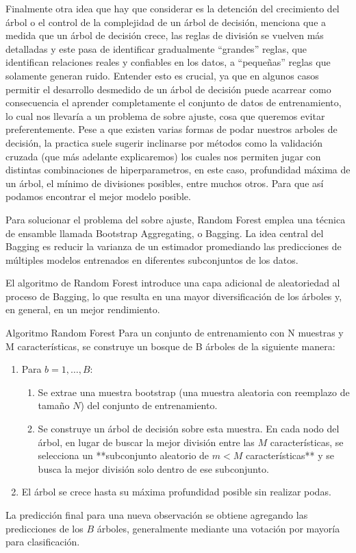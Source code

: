 Finalmente otra idea que hay que considerar es la detención del crecimiento del árbol o el control de la complejidad de un árbol de decisión, \cite{EstadisticaPracticacd} menciona que a medida que un árbol de decisión crece, las reglas de división se vuelven más detalladas y este pasa de identificar gradualmente ``grandes'' reglas, que identifican relaciones reales y confiables en los datos, a ``pequeñas'' reglas que solamente generan ruido. Entender esto es crucial, ya que en algunos casos permitir el desarrollo desmedido de un árbol de decisión puede acarrear como consecuencia el aprender completamente el conjunto de datos de entrenamiento, lo cual nos llevaría a un problema de sobre ajuste, cosa que queremos evitar preferentemente. Pese a que existen varias formas de podar nuestros arboles de decisión, la practica suele sugerir inclinarse por métodos como la validación cruzada (que más adelante explicaremos) los cuales nos permiten jugar con distintas combinaciones de hiperparametros, en este caso, profundidad máxima de un árbol, el mínimo de divisiones posibles, entre muchos otros. Para que así podamos encontrar el mejor modelo posible.


Para solucionar el problema del sobre ajuste, Random Forest emplea una técnica de ensamble llamada Bootstrap Aggregating, o Bagging. La idea central del Bagging es reducir la varianza de un estimador promediando las predicciones de múltiples modelos entrenados en diferentes subconjuntos de los datos. 

El algoritmo de Random Forest introduce una capa adicional de aleatoriedad al proceso de Bagging, lo que resulta en una mayor diversificación de los árboles y, en general, en un mejor rendimiento.

\begin{definicion}{Algoritmo Random Forest}
	Para un conjunto de entrenamiento con N muestras y M características, se construye un bosque de B árboles de la siguiente manera:
	
	\begin{enumerate}
		\item Para $b = 1, \dots, B$:
		\begin{enumerate}
			\item Se extrae una muestra bootstrap (una muestra aleatoria con reemplazo de tamaño $N$) del conjunto de entrenamiento.
			\item Se construye un árbol de decisión sobre esta muestra. En cada nodo del árbol, en lugar de buscar la mejor división entre las $M$ características, se selecciona un **subconjunto aleatorio de $m < M$ características** y se busca la mejor división solo dentro de ese subconjunto.
		\end{enumerate}
		\item El árbol se crece hasta su máxima profundidad posible sin realizar podas.
	\end{enumerate}
	
	La predicción final para una nueva observación se obtiene agregando las predicciones de los $B$ árboles, generalmente mediante una votación por mayoría para clasificación.
\end{definicion}

